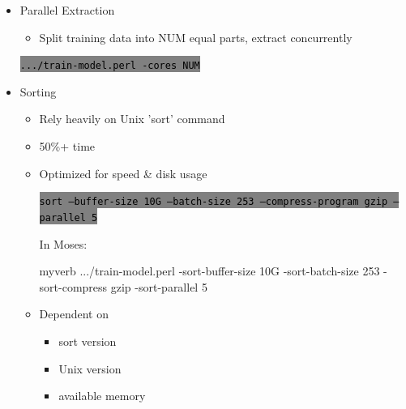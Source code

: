 \documentclass[landscape]{uedslides2C}
\newcommand{\littlecode}[1]{\colorbox{gray}{\textcolor{black}{\small \tt #1}}}
\begin{document}


\begin{itemize} \itemsep -1mm

\item {Parallel Extraction}
  \begin{itemize}
  \item Split training data into NUM equal parts, extract concurrently
  \end{itemize}
  \begin{center}
    \littlecode{.../train-model.perl -cores NUM}
  \end{center}      
\end{itemize}


\begin{itemize} \itemsep -1mm
\item {Sorting}
  \begin{itemize}
  \item Rely heavily on Unix 'sort' command
    \item 50\%+ time 
  \item Optimized for speed \& disk usage
  \begin{center}
    \littlecode{sort --buffer-size 10G --batch-size 253 --compress-program gzip --parallel 5}
  \end{center}      
  In Moses:
    \begin{SaveVerbatim}{myverb}
    .../train-model.perl  -sort-buffer-size 10G 
      -sort-batch-size 253 -sort-compress gzip -sort-parallel 5
    \end{SaveVerbatim}
    \colorbox{gray}{}

  \item Dependent on
    \begin{itemize}
    \item      sort version
    \item      Unix version
    \item      available memory
    \end{itemize}
  \end{itemize}

\end{itemize}
\end{document}
